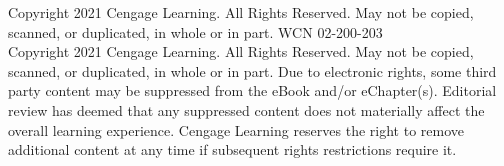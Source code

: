 \vfill
\noindent
\begin{minipage}{\textwidth}
  \centering
  \fontsize{6.5pt}{8pt}\selectfont\color{gray}
  Copyright 2021 Cengage Learning. All Rights Reserved. May not be copied, scanned, or duplicated, in whole or in part. WCN 02-200-203\\[1.5pt]
  Copyright 2021 Cengage Learning. All Rights Reserved. May not be copied, scanned, or duplicated, in whole or in part. Due to electronic rights, some third party content may be suppressed from the eBook and/or eChapter(s). Editorial review has deemed that any suppressed content does not materially affect the overall learning experience. Cengage Learning reserves the right to remove additional content at any time if subsequent rights restrictions require it.
\end{minipage}
